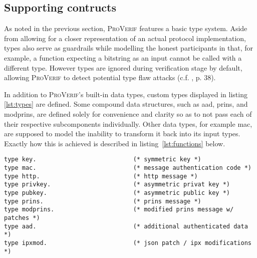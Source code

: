 \lstset{style=proverif}

\subsection{Supporting contructs}

As noted in the previous section, \textsc{ProVerif} features a basic type system.
Aside from allowing for a closer representation of an actual protocol implementation, types also serve as guardrails while modelling the honest participants in that, for example, a function expecting a bitstring as an input cannot be called with a different type.
However types are ignored during verification stage by default, allowing \textsc{ProVerif} to detect potential type flaw attacks (c.f. \cite{blanchet2020proverif}, p. 38).

In addition to \textsc{ProVerif}'s built-in data types, custom types displayed in listing \ref{lst:types} are defined.
Some compound data structures, such as aad, prins, and modprins, are defined solely for convenience and clarity so as to not pass each of their respective subcomponents individually.
Other data types, for example mac, are supposed to model the inability to transform it back into its input types.
Exactly how this is achieved is described in listing~\ref{lst:functions} below.

\begin{lstlisting}[caption={Custom type definitions},label={lst:types},firstnumber=3]
type key.                           (* symmetric key *)
type mac.                           (* message authentication code *)
type http.                          (* http message *)
type privkey.                       (* asymmetric privat key *)
type pubkey.                        (* asymmetric public key *)
type prins.                         (* prins message *)
type modprins.                      (* modified prins message w/ patches *)
type aad.                           (* additional authenticated data *)
type ipxmod.                        (* json patch / ipx modifications *)
\end{lstlisting}

